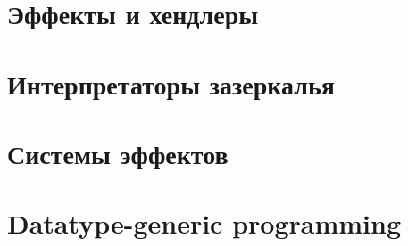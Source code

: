 \documentclass[12pt]{article}
\begin{document}
    \section{Эффекты и хендлеры} \label{sec:effect-handlers}
%
%
%    


    \section{Интерпретаторы зазеркалья} \label{sec:wonder-interpreters}
%
%    
%


%
%    


    \section{Системы эффектов} \label{sec:effect-systems}
%
%    
%


    \section{Datatype-generic programming} \label{sec:datatype-generic}
%
%    
%




%
%    






    
\end{document}
